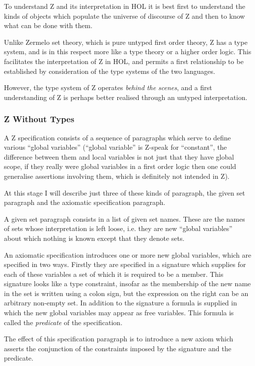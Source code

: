 \documentclass[10pt,titlepage]{book}
\begin{document}
To understand Z and its interpretation in HOL it is best first to understand the kinds of objects which populate the universe of discourse of Z and then to know what can be done with them.

Unlike Zermelo set theory, which is pure untyped first order theory, Z has a type system, and is in this respect more like a type theory or a higher order logic.
This facilitates the interpretation of Z in HOL, and permits a first relationship to be established by consideration of the type systems of the two languages.

However, the type system of Z operates {\it behind the scenes}, and a first understanding of Z is perhaps better realised through an untyped interpretation.

\subsubsection{Z Without Types}

A Z specification consists of a sequence of paragraphs which serve to define various ``global variables'' (``global variable'' is Z-speak for ``constant'', the difference between them and local variables is not just that they have global scope, if they really were global variables in a first order logic then one could generalise assertions involving them, which is definitely not intended in Z).

At this stage I will describe just three of these kinds of paragraph, the given set paragraph and the axiomatic specification paragraph.

A given set paragraph consists in a list of given set names.
These are the names of sets whose interpretation is left loose, i.e. they are new ``global variables'' about which nothing is known except that they denote sets.

An axiomatic specification introduces one or more new global variables, which are specified in two ways.
Firstly they are specified in a signature which supplies for each of these variables a set of which it is required to be a member.
This signature looks like a type constraint, insofar as the membership of the new name in the set is written using a colon sign, but the expression on the right can be an arbitrary non-empty set.
In addition to the signature a formula is supplied in which the new global variables may appear as free variables.
This formula is called the {\it predicate} of the specification. 

The effect of this specification paragraph is to introduce a new axiom which asserts the conjunction of the constraints imposed by the signature and the predicate.
\end{document}
